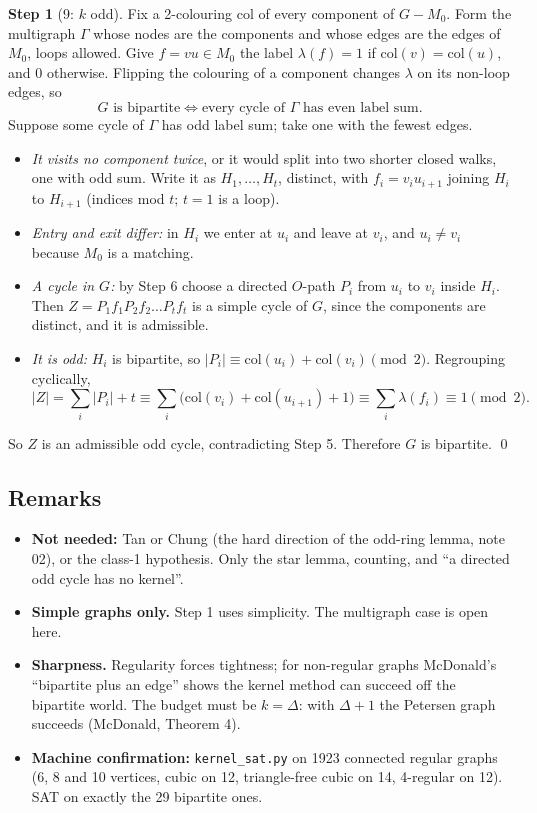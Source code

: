 \documentclass[11pt]{article}
\theoremstyle{plain}
\theoremstyle{definition}
\newtheorem*{step}{Step}
\begin{document}
\begin{step}[9: $k$ odd]
Fix a 2-colouring $\mathrm{col}$ of every component of $G - M_0$. Form the multigraph $\Gamma$
whose nodes are the components and whose edges are the edges of $M_0$, loops allowed. Give
$f = vu \in M_0$ the label $\lambda(f) = 1$ if $\mathrm{col}(v) = \mathrm{col}(u)$, and $0$
otherwise. Flipping the colouring of a component changes $\lambda$ on its non-loop edges, so
\[
  G \text{ is bipartite} \iff \text{every cycle of } \Gamma \text{ has even label sum.}
\]
Suppose some cycle of $\Gamma$ has odd label sum; take one with the fewest edges.
\begin{itemize}[nosep]
  \item \emph{It visits no component twice}, or it would split into two shorter closed walks,
        one with odd sum. Write it as $H_1, \dots, H_t$, distinct, with $f_i = v_i u_{i+1}$
        joining $H_i$ to $H_{i+1}$ (indices mod $t$; $t = 1$ is a loop).
  \item \emph{Entry and exit differ:} in $H_i$ we enter at $u_i$ and leave at $v_i$, and
        $u_i \ne v_i$ because $M_0$ is a matching.
  \item \emph{A cycle in $G$:} by Step 6 choose a directed $O$-path $P_i$ from $u_i$ to $v_i$
        inside $H_i$. Then $Z = P_1 f_1 P_2 f_2 \dots P_t f_t$ is a simple cycle of $G$, since
        the components are distinct, and it is admissible.
  \item \emph{It is odd:} $H_i$ is bipartite, so $|P_i| \equiv \mathrm{col}(u_i) +
        \mathrm{col}(v_i) \pmod 2$. Regrouping cyclically,
        \[
          |Z| = \sum_i |P_i| + t \equiv \sum_i \bigl(\mathrm{col}(v_i) + \mathrm{col}(u_{i+1})
          + 1\bigr) \equiv \sum_i \lambda(f_i) \equiv 1 \pmod 2.
        \]
\end{itemize}
So $Z$ is an admissible odd cycle, contradicting Step 5. Therefore $G$ is bipartite. \qed
\end{step}

\subsection*{Remarks}
\begin{itemize}[nosep]
  \item \textbf{Not needed:} Tan or Chung (the hard direction of the odd-ring lemma, note 02), or
        the class-1 hypothesis. Only the star lemma, counting, and ``a directed odd cycle has no
        kernel''.
  \item \textbf{Simple graphs only.} Step 1 uses simplicity. The multigraph case is open here.
  \item \textbf{Sharpness.} Regularity forces tightness; for non-regular graphs McDonald's
        ``bipartite plus an edge'' shows the kernel method can succeed off the bipartite world.
        The budget must be $k = \Delta$: with $\Delta + 1$ the Petersen graph succeeds
        (McDonald, Theorem 4).
  \item \textbf{Machine confirmation:} \texttt{kernel\_sat.py} on 1923 connected regular graphs
        (6, 8 and 10 vertices, cubic on 12, triangle-free cubic on 14, 4-regular on 12). SAT on
        exactly the 29 bipartite ones.
\end{itemize}
\end{document}
